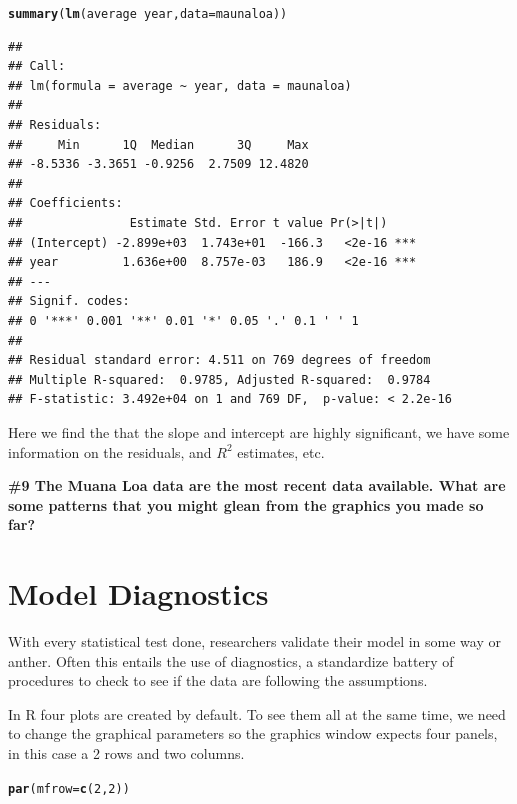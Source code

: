 \documentclass{tufte-handout}\usepackage[]{graphicx}\usepackage[]{xcolor}
\makeatletter
\newcommand{\hlnum}[1]{\textcolor[rgb]{0.686,0.059,0.569}{#1}}%
\newcommand{\hlopt}[1]{\textcolor[rgb]{0,0,0}{#1}}%
\newcommand{\hlstd}[1]{\textcolor[rgb]{0.345,0.345,0.345}{#1}}%
\newcommand{\hlkwc}[1]{\textcolor[rgb]{0.333,0.667,0.333}{#1}}%
\newcommand{\hlkwd}[1]{\textcolor[rgb]{0.737,0.353,0.396}{\textbf{#1}}}%
\newenvironment{kframe}{%
 \def\at@end@of@kframe{}%
 \ifinner\ifhmode%
  \def\at@end@of@kframe{\end{minipage}}%
  \begin{minipage}{\columnwidth}%
 \fi\fi%
 \def\FrameCommand##1{\hskip\@totalleftmargin \hskip-\fboxsep
 \colorbox{shadecolor}{##1}\hskip-\fboxsep
     \hskip-\linewidth \hskip-\@totalleftmargin \hskip\columnwidth}%
 \MakeFramed {\advance\hsize-\width
   \@totalleftmargin\z@ \linewidth\hsize
   \@setminipage}}%
 {\par\unskip\endMakeFramed%
 \at@end@of@kframe}
\newenvironment{knitrout}{}{} %
\makeatother
\begin{document}
\begin{knitrout}
\color{fgcolor}\begin{kframe}
\begin{alltt}
\hlkwd{summary}\hlstd{(}\hlkwd{lm}\hlstd{(average} \hlopt{~} \hlstd{year,} \hlkwc{data}\hlstd{=maunaloa))}
\end{alltt}
\begin{verbatim}
## 
## Call:
## lm(formula = average ~ year, data = maunaloa)
## 
## Residuals:
##     Min      1Q  Median      3Q     Max 
## -8.5336 -3.3651 -0.9256  2.7509 12.4820 
## 
## Coefficients:
##               Estimate Std. Error t value Pr(>|t|)    
## (Intercept) -2.899e+03  1.743e+01  -166.3   <2e-16 ***
## year         1.636e+00  8.757e-03   186.9   <2e-16 ***
## ---
## Signif. codes:  
## 0 '***' 0.001 '**' 0.01 '*' 0.05 '.' 0.1 ' ' 1
## 
## Residual standard error: 4.511 on 769 degrees of freedom
## Multiple R-squared:  0.9785,	Adjusted R-squared:  0.9784 
## F-statistic: 3.492e+04 on 1 and 769 DF,  p-value: < 2.2e-16
\end{verbatim}
\end{kframe}
\end{knitrout}

Here we find the that the slope and intercept are highly significant, we have some information on the residuals, and $R^2$ estimates, etc.

\bigskip
\noindent  \textbf{\#9 The Muana Loa data are the most recent data available. What are some patterns that you might glean from the graphics you made so far? }

\section{Model Diagnostics}

With every statistical test done, researchers validate their model in some way or anther. Often this entails the use of diagnostics, a standardize battery of procedures to check to see if the data are following the assumptions. 

In R four plots are created by default.  To see them all at the same time, we need to change the graphical parameters so the graphics window expects four panels, in this case a 2 rows and two columns. 

\begin{knitrout}
\color{fgcolor}\begin{kframe}
\begin{alltt}
\hlkwd{par}\hlstd{(}\hlkwc{mfrow}\hlstd{=}\hlkwd{c}\hlstd{(}\hlnum{2}\hlstd{,}\hlnum{2}\hlstd{))}
\end{alltt}
\end{kframe}
\end{knitrout}
\end{document}
